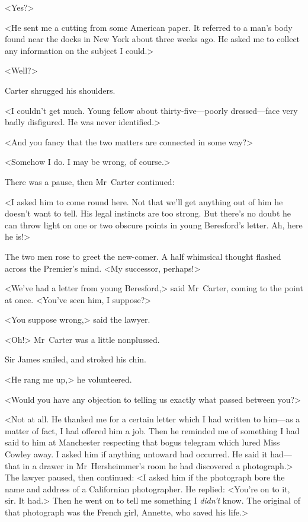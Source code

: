<Yes?>

<He sent me a cutting from some American paper. It referred to a man's body found near the docks in New York about three weeks ago. He asked me to collect any information on the subject I could.>

<Well?>

Carter shrugged his shoulders.

<I couldn't get much. Young fellow about thirty-five—poorly dressed—face very badly disfigured. He was never identified.>

<And you fancy that the two matters are connected in some way?>

<Somehow I do. I may be wrong, of course.>

There was a pause, then Mr~Carter continued:

<I asked him to come round here. Not that we'll get anything out of him he doesn't want to tell. His legal instincts are too strong. But there's no doubt he can throw light on one or two obscure points in young Beresford's letter. Ah, here he is!>

The two men rose to greet the new-comer. A half whimsical thought flashed across the Premier's mind. <My successor, perhaps!>

<We've had a letter from young Beresford,> said Mr~Carter, coming to the point at once. <You've seen him, I suppose?>

<You suppose wrong,> said the lawyer.

<Oh!> Mr~Carter was a little nonplussed.

Sir James smiled, and stroked his chin.

<He rang me up,> he volunteered.

<Would you have any objection to telling us exactly what passed between you?>

<Not at all. He thanked me for a certain letter which I had written to him—as a matter of fact, I had offered him a job. Then he reminded me of something I had said to him at Manchester respecting that bogus telegram which lured Miss Cowley away. I asked him if anything untoward had occurred. He said it had—that in a drawer in Mr~Hersheimmer's room he had discovered a photograph.> The lawyer paused, then continued: <I asked him if the photograph bore the name and address of a Californian photographer. He replied: <You're on to it, sir. It had.> Then he went on to tell me something I \emph{didn't} know. The original of that photograph was the French girl, Annette, who saved his life.>

